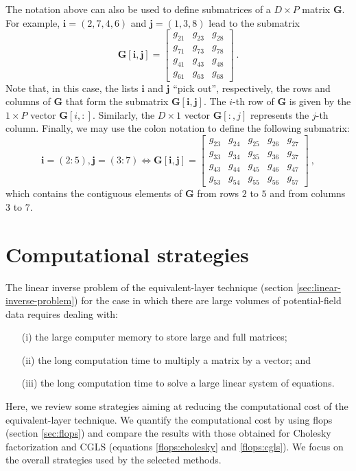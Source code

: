 \documentclass[utf8]{FrontiersinHarvard} %
\begin{document}
	The notation above can also be used to define submatrices of a $D \times P$ matrix $\mathbf{G}$. 
	For example, $\mathbf{i} = (2, 7, 4, 6)$ and $\mathbf{j} = (1, 3, 8)$ lead to the submatrix
	\begin{equation*}
		\mathbf{G}[\mathbf{i}, \mathbf{j}] = \begin{bmatrix}
			g_{21} & g_{23} & g_{28} \\
			g_{71} & g_{73} & g_{78} \\
			g_{41} & g_{43} & g_{48} \\
			g_{61} & g_{63} & g_{68} 
		\end{bmatrix} \: .
	\end{equation*}
	Note that, in this case, the lists $\mathbf{i}$ and $\mathbf{j}$ ``pick out'', respectively, the rows and columns
	of $\mathbf{G}$ that form the submatrix $\mathbf{G}[\mathbf{i}, \mathbf{j}]$.
	The $i$-th row of $\mathbf{G}$ is given by the $1 \times P$ vector $\mathbf{G}[i,:]$.
	Similarly, the $D \times 1$ vector $\mathbf{G}[:,j]$ represents the $j$-th column.
	Finally, we may use the colon notation to define the following submatrix:
	\begin{equation*}
		\mathbf{i} = (2:5), \mathbf{j} = (3:7) \Leftrightarrow
		\mathbf{G}[\mathbf{i},\mathbf{j}] = \begin{bmatrix}
			g_{23} & g_{24} & g_{25} & g_{26} & g_{27} \\
			g_{33} & g_{34} & g_{35} & g_{36} & g_{37} \\
			g_{43} & g_{44} & g_{45} & g_{46} & g_{47} \\
			g_{53} & g_{54} & g_{55} & g_{56} & g_{57}
		\end{bmatrix} \: ,
	\end{equation*}
	which contains the contiguous elements of $\mathbf{G}$ from rows $2$ to $5$ and from columns
	$3$ to $7$.
	
	\section{Computational strategies}
	\label{sec:computational-strategies}
	
	The linear inverse problem of the equivalent-layer technique (section \ref{sec:linear-inverse-problem}) for the case
	in which there are large volumes of potential-field data requires dealing with:
	\begin{itemize}
		\item[(i)] the large computer memory to store large and full matrices;
		\item[(ii)] the long computation time to multiply a matrix by a vector; and
		\item[(iii)] the long computation time to solve a large linear system of equations.
	\end{itemize}
	Here, we review some strategies aiming at reducing the computational cost of the equivalent-layer technique. 
	We quantify the computational cost by using flops (section \ref{sec:flops}) and compare the results with those obtained for Cholesky factorization and CGLS (equations \ref{flops:cholesky} and \ref{flops:cgls}). 
	We focus on the overall strategies used by the selected methods.
	
\end{document}
